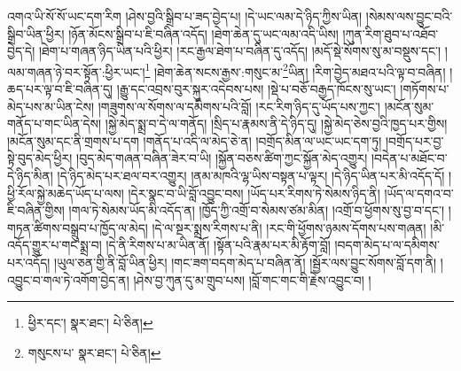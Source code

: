 འགའ་ཡི་སོ་སོ་ཡང་དག་རིག །ཤེས་བྱའི་སྒྲིབ་པ་ཟད་བྱེད་པ། །དེ་ཡང་ལམ་དེ་ཉིད་ཀྱིས་ཡིན། །སེམས་ལས་བྱུང་བའི་སྒྲིབ་ཡིན་ཕྱིར། །ཉོན་མོངས་སྒྲིབ་པ་ཇི་བཞིན་འདོད། །ཐེག་ཆེན་དུ་ཡང་ལམ་འདི་ཡིས། །ཀུན་རིག་ཐུབ་པ་འཐོབ་བྱེད་དེ། །ཐེག་པ་གཞན་ཉིད་ཡིན་པའི་ཕྱིར། །རང་རྒྱལ་ཐེག་པ་བཞིན་དུ་འདོད། །མདོ་སྡེ་སོགས་སུ་མ་བསྡུས་དང་། །ལམ་གཞན་ཉེ་བར་སྟོན་:ཕྱིར་ཡང་།\footnote{ཕྱིར་དང་།  སྣར་ཐང་།  པེ་ཅིན། } །ཐེག་ཆེན་སངས་རྒྱས་:གསུང་མ་\footnote{གསུངས་པ་  སྣར་ཐང་།  པེ་ཅིན། }ཡིན། །རིག་བྱེད་མཐའ་པའི་ལྟ་བ་བཞིན། །ཆད་པར་ལྟ་བ་ཇི་བཞིན་དུ། །རྒྱུ་དང་འབྲས་བུར་སྐུར་འདེབས་པས། །སྡེ་པ་བཅོ་བརྒྱད་ཁོངས་སུ་ཡང་། །གཏོགས་པ་མེད་པས་མ་ཡིན་ངེས། །གཟུགས་ལ་སོགས་ལ་དམིགས་པའི་བློ། །རང་རིག་ཉིད་དུ་ཡོད་པས་ཀྱང་། །མངོན་སུམ་གནོད་པ་གང་ཡིན་དེས། །སྐྱེ་མེད་སྨྲ་བ་དེ་ལ་གནོད། །སྲིད་པ་རྣམས་ནི་དེ་ཉིད་དུ། །སྐྱེ་མེད་ཅེས་བྱའི་ཁྱད་པར་གྱིས། །མངོན་སུམ་དང་ནི་གྲགས་པ་དག །གནོད་པ་འདི་ལ་མེད་ཅེ་ན། །བགྲོད་མིན་ལ་ཡང་ཡང་དག་ཏུ། །བགྲོད་པར་བྱ་སྟེ་བུད་མེད་ཕྱིར། །བུད་མེད་གཞན་བཞིན་ཟེར་བ་ཡི། །སྐྱོན་བཅས་ཚིག་ཀྱང་སྐྱོན་མེད་འགྱུར། །བདེན་པ་མཐོང་བ་དེ་ཉིད་མིན། །དེ་ཉིད་མེད་པར་ཐལ་བར་འགྱུར། །ནམ་མཁའི་ལྷ་ཡིས་བསྟན་པ་ལྟར། །དེ་ཉིད་ཡིན་པར་མི་འདོད་དོ། །ཕྱི་རོལ་སྐྱེ་མཆེད་ཡོད་པ་ལས། །དེར་སྣང་བ་ཡི་བློ་འབྱུང་བས། །ཡོད་པར་རིགས་ཏེ་སེམས་ཉིད་ནི། །ཡོད་ལ་དགའ་བ་ཇི་བཞིན་གྱིས། །གལ་ཏེ་སེམས་ཡོད་མི་འདོད་ན། །ཁྱོད་ཀྱི་འགྲོ་བ་སེམས་ཙམ་མིན། །འགྲོ་བ་ཕྱོགས་སུ་བྱ་བ་དང་། །གཏན་ཚིགས་བསྒྲུབ་པ་ཁྱོད་ལ་མེད། །དེ་ལ་སྔར་སྨྲས་རིགས་པ་ནི། །རང་གི་ཕྱོགས་ཉམས་དོགས་པས་གཞན། །མི་འདོད་གྱུར་པ་གང་སྨྲ་བ། །དེ་ནི་རིགས་པ་མ་ཡིན་ནོ། །སྟོན་པའི་རྣམ་པར་མི་རྟོག་བློ། །བདག་མེད་པ་ལ་དམིགས་པར་འདོད། །ཡུལ་ཅན་གྱི་ནི་བློ་ཡིན་ཕྱིར། །གང་ཟག་བདག་མེད་པ་བཞིན་ནོ། །སྦྱོར་ལས་བྱུང་སོགས་བློ་དག་ནི། །འབྱུང་བ་གལ་ཏེ་འགོག་བྱེད་ན། །ཤེས་བྱ་ཀུན་དུ་མ་གྲུབ་པས། །བློ་གང་གང་གི་རྗེས་འབྱུང་བ། །
